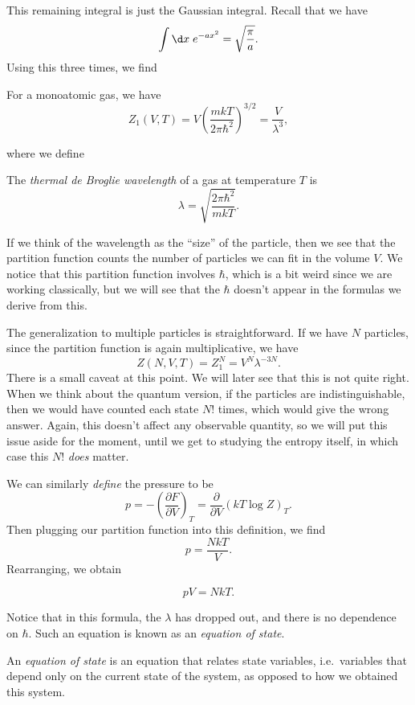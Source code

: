 \documentclass[a4paper]{article}
\begin{document}
This remaining integral is just the Gaussian integral. Recall that we have
\[
  \int \d x\; e^{-a x^2} = \sqrt{\frac{\pi}{a}}.
\]
Using this three times, we find
\begin{prop}
  For a monoatomic gas, we have
  \[
    Z_1(V, T) = V\left(\frac{mkT}{2\pi \hbar^2}\right)^{3/2} = \frac{V}{\lambda^3},
  \]
\end{prop}
where we define
\begin{defi}\index{$\lambda$}
  The \emph{thermal de Broglie wavelength} of a gas at temperature $T$ is
  \[
    \lambda = \sqrt{\frac{2\pi \hbar^2}{mkT}}.
  \]
\end{defi}
If we think of the wavelength as the ``size'' of the particle, then we see that the partition function counts the number of particles we can fit in the volume $V$. We notice that this partition function involves $\hbar$, which is a bit weird since we are working classically, but we will see that the $\hbar$ doesn't appear in the formulas we derive from this.

The generalization to multiple particles is straightforward. If we have $N$ particles, since the partition function is again multiplicative, we have
\[
  Z(N, V, T) = Z_1^N = V^N \lambda^{-3N}.
\]
There is a small caveat at this point. We will later see that this is not quite right. When we think about the quantum version, if the particles are indistinguishable, then we would have counted each state $N!$ times, which would give the wrong answer. Again, this doesn't affect any observable quantity, so we will put this issue aside for the moment, until we get to studying the entropy itself, in which case this $N!$ \emph{does} matter.

We can similarly \emph{define} the pressure to be
\[
  p = - \left(\frac{\partial F}{\partial V}\right)_T = \frac{\partial}{\partial V} (k T \log Z)_T.
\]
Then plugging our partition function into this definition, we find
\[
  p = \frac{NkT}{V}.
\]
Rearranging, we obtain
\begin{prop}
  \[
    pV = NkT.
  \]
\end{prop}
Notice that in this formula, the $\lambda$ has dropped out, and there is no dependence on $\hbar$. Such an equation is known as an \emph{equation of state}.

\begin{defi}
  An \emph{equation of state} is an equation that relates state variables, i.e.\ variables that depend only on the current state of the system, as opposed to how we obtained this system.
\end{defi}
\end{document}

